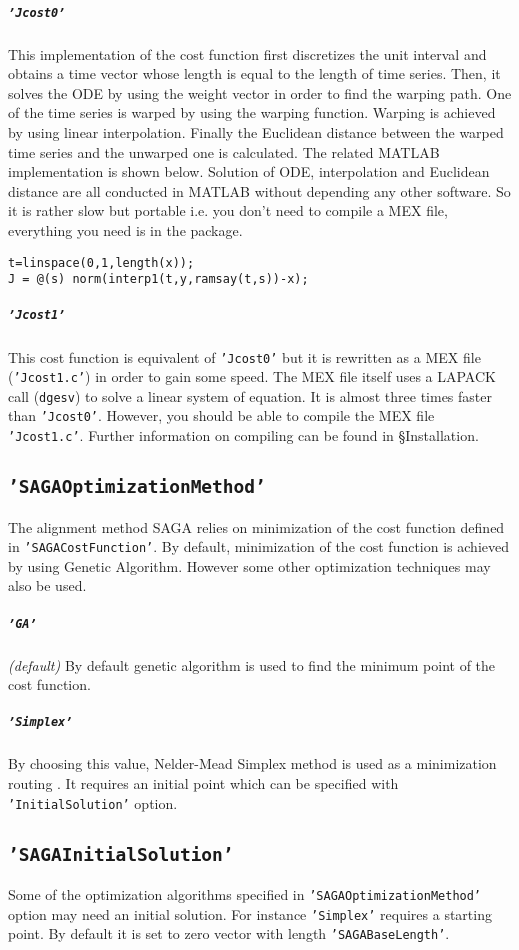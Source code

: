 \documentclass{article}
\begin{document}
\subparagraph*{\texttt{'Jcost0'}} This implementation of the cost function first discretizes the unit interval and obtains a time vector whose length is equal to the length of time series. Then,  it solves the ODE by using the weight vector in order to find the warping path. One of the time series is warped by using the warping function. Warping is achieved by using  linear interpolation. Finally the Euclidean distance between the warped time series and the unwarped one is calculated. The related MATLAB implementation is shown below. Solution of ODE, interpolation and Euclidean distance are all conducted in MATLAB without depending any other software. So it is rather slow but portable i.e. you don't need to compile a MEX file, everything you need is in the package. 
\begin{verbatim}
t=linspace(0,1,length(x));
J = @(s) norm(interp1(t,y,ramsay(t,s))-x);
\end{verbatim}

\subparagraph*{\texttt{'Jcost1'}} This cost function is equivalent of \texttt{'Jcost0'} but it is rewritten as a MEX file (\texttt{'Jcost1.c'}) in order to gain some speed. The MEX file itself uses a LAPACK call (\texttt{dgesv}) to solve a linear system of equation. It is almost three times faster than \texttt{'Jcost0'}. However, you should be able to compile the MEX file \texttt{'Jcost1.c'}. Further information on compiling can be found in \S Installation.

\subsection*{\texttt{'SAGAOptimizationMethod'}}
The alignment method SAGA relies on minimization of the cost function defined in \texttt{'SAGACostFunction'}. By default, minimization of the cost function is achieved by using Genetic Algorithm. However some other optimization techniques may also be used.

\subparagraph*{\texttt{'GA'}} {\it (default)} By default genetic algorithm is used to find the minimum point of the cost function.

\subparagraph*{\texttt{'Simplex'}} By choosing this value, Nelder-Mead Simplex method is used as a minimization routing \cite{Lagarias1998}. It requires an initial point which can be specified with \texttt{'InitialSolution'} option.

\subsection{\texttt{'SAGAInitialSolution'}}
Some of the optimization algorithms specified in \texttt{'SAGAOptimizationMethod'} option may need an initial solution. For instance \texttt{'Simplex'} requires a starting point. By default it is set to zero vector with length \texttt{'SAGABaseLength'}.
\end{document}

